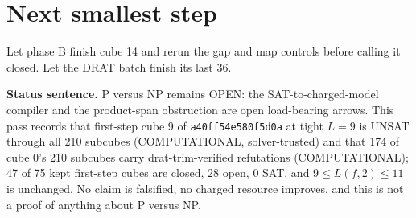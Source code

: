 \documentclass[11pt]{article}
\begin{document}
\section*{Next smallest step}
Let phase B finish cube 14 and rerun the gap and map controls before calling it closed. Let the DRAT batch finish its last 36.

\bigskip
\noindent\textbf{Status sentence.} P versus NP remains OPEN: the SAT-to-charged-model compiler and the product-span obstruction are open load-bearing arrows. This pass records that first-step cube 9 of \texttt{a40ff54e580f5d0a} at tight $L=9$ is UNSAT through all 210 subcubes (COMPUTATIONAL, solver-trusted) and that 174 of cube 0's 210 subcubes carry drat-trim-verified refutations (COMPUTATIONAL); 47 of 75 kept first-step cubes are closed, 28 open, 0 SAT, and $9\le L(f,2)\le 11$ is unchanged. No claim is falsified, no charged resource improves, and this is not a proof of anything about P versus NP.
\end{document}
